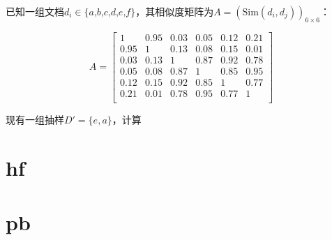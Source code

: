 \documentclass{../notes}
\newcommand{\Sim}{\text{Sim}}
\begin{document}
    \begin{example}
        已知一组文档$d_i \in\{\textit{a,b,c,d,e,f}\}$，其相似度矩阵为$A = (\Sim(d_i, d_j))_{6\times 6}$：

        \begin{equation}
            A = \begin{bmatrix}
                1 & 0.95 & 0.03 & 0.05 & 0.12 & 0.21 \\
                0.95 & 1 & 0.13 & 0.08 & 0.15 & 0.01 \\
                0.03 & 0.13 & 1 & 0.87 & 0.92 & 0.78 \\
                0.05 & 0.08 & 0.87 & 1 & 0.85 & 0.95 \\
                0.12 & 0.15 & 0.92 & 0.85 & 1 & 0.77 \\
                0.21 & 0.01 & 0.78 & 0.95 & 0.77 & 1 \\
            \end{bmatrix}
        \end{equation}

        现有一组抽样$D' = \{e, a\}$，计算
    \end{example}

    \section{hf}

    \section{pb}
\end{document}
